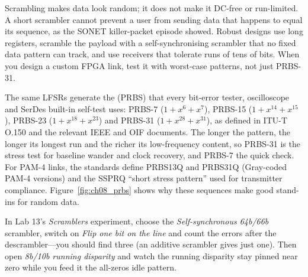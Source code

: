 \begin{pitfall}
Scrambling makes data look random; it does not make it DC-free or run-limited. A short
scrambler cannot prevent a user from sending data that happens to equal its sequence, as the
SONET killer-packet episode showed. Robust designs use long registers, scramble the payload
with a self-synchronising scrambler that no fixed data pattern can track, and use receivers
that tolerate runs of tens of bits. When you design a custom FPGA link, test it with
worst-case patterns, not just PRBS-31.
\end{pitfall}

\begin{inpractice}
The same LFSRs generate the  (PRBS) that every bit-error
tester, oscilloscope and SerDes built-in self-test uses: PRBS-7 ($1+x^6+x^7$), PRBS-15
($1+x^{14}+x^{15}$), PRBS-23 ($1+x^{18}+x^{23}$) and PRBS-31 ($1+x^{28}+x^{31}$), as defined in
ITU-T O.150 and the relevant IEEE and OIF documents. The longer the pattern, the longer its
longest run and the richer its low-frequency content, so PRBS-31 is the stress test for
baseline wander and clock recovery, and PRBS-7 the quick check. For PAM-4 links, the
standards define PRBS13Q and PRBS31Q (Gray-coded PAM-4 versions) and the SSPRQ ``short
stress pattern'' used for transmitter compliance. Figure~\ref{fig:ch08_prbs} shows why these
sequences make good stand-ins for random data.
\end{inpractice}


\begin{tryit}
In Lab 13's \emph{Scramblers} experiment, choose the \emph{Self-synchronous 64b/66b} scrambler,
switch on \emph{Flip one bit on the line} and count the errors after the descrambler---you should
find three (an additive scrambler gives just one). Then open \emph{8b/10b running disparity} and
watch the running disparity stay pinned near zero while you feed it the all-zeros idle pattern.
\end{tryit}

